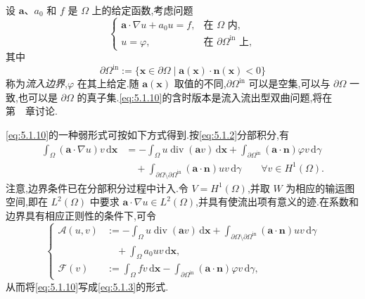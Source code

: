 \begin{example}[(定常对流问题)]\label{ex:5.1.3}
设 \(\boldsymbol{a}\)、\(a_0\) 和 \(f\) 是 \(\Omega\) 上的给定函数,考虑问题
\begin{equation}\label{eq:5.1.10}
  \begin{cases}
    \boldsymbol{a}\cdot\nabla u+a_0u=f,&\text{在 }\Omega\text{ 内},\\
    u=\varphi,&\text{在 }\partial\Omega^{\mathrm{in}}\text{ 上},
  \end{cases}
\end{equation}
其中
\[
  \partial\Omega^{\mathrm{in}}
  :=\{\boldsymbol{x}\in\partial\Omega\mid\boldsymbol{a}(\boldsymbol{x})\cdot\boldsymbol{n}(\boldsymbol{x})<0\}
\]
称为\emph{流入边界},\(\varphi\) 在其上给定.随 \(\boldsymbol{a}(\boldsymbol{x})\) 取值的不同,\(\partial\Omega^{\mathrm{in}}\) 可以是空集,可以与 \(\partial\Omega\) 一致,也可以是 \(\partial\Omega\) 的真子集.\eqref{eq:5.1.10}的含时版本是流入流出型双曲问题,将在第~~章讨论.

\eqref{eq:5.1.10}的一种弱形式可按如下方式得到.按\eqref{eq:5.1.2}分部积分,有
\[
  \begin{aligned}
    \int_\Omega(\boldsymbol{a}\cdot\nabla u)v\,\mathrm d\boldsymbol{x}
    &=-\int_\Omega u\operatorname{div}(\boldsymbol{a}v)\,\mathrm d\boldsymbol{x}
      +\int_{\partial\Omega^{\mathrm{in}}}(\boldsymbol{a}\cdot\boldsymbol{n})\varphi v\,\mathrm d\gamma\\
    &\quad+\int_{\partial\Omega\setminus\partial\Omega^{\mathrm{in}}}
         (\boldsymbol{a}\cdot\boldsymbol{n})uv\,\mathrm d\gamma
         \qquad\forall v\in H^1(\Omega).
  \end{aligned}
\]
注意,边界条件已在分部积分过程中计入.令 \(V=H^1(\Omega)\),并取 \(W\) 为相应的输运图空间,即在 \(L^2(\Omega)\) 中要求 \(\boldsymbol{a}\cdot\nabla u\in L^2(\Omega)\),并具有使流出项有意义的迹.在系数和边界具有相应正则性的条件下,可令
\begin{equation}\label{eq:5.1.11}
  \left\{
  \begin{aligned}
    \mathcal A(u,v)&:=-\int_\Omega u\operatorname{div}(\boldsymbol{a}v)\,\mathrm d\boldsymbol{x}
      +\int_{\partial\Omega\setminus\partial\Omega^{\mathrm{in}}}
           (\boldsymbol{a}\cdot\boldsymbol{n})uv\,\mathrm d\gamma\\
      &\quad+\int_\Omega a_0uv\,\mathrm d\boldsymbol{x},\\
    \mathcal F(v)&:=\int_\Omega fv\,\mathrm d\boldsymbol{x}
      -\int_{\partial\Omega^{\mathrm{in}}}(\boldsymbol{a}\cdot\boldsymbol{n})\varphi v\,\mathrm d\gamma,
  \end{aligned}
  \right.
\end{equation}
从而将\eqref{eq:5.1.10}写成\eqref{eq:5.1.3}的形式.
\end{example}

